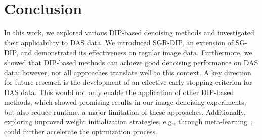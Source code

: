 \chapter{Conclusion}

In this work, we explored various DIP-based denoising methods and investigated their applicability to DAS data.
We introduced SGR-DIP, an extension of SG-DIP, and demonstrated its effectiveness on regular image data.
Furthermore, we showed that DIP-based methods can achieve good denoising performance on DAS data; however, not all approaches translate well to this context.
A key direction for future research is the development of an effective early stopping criterion for DAS data. This would not only enable the application of other DIP-based methods, which showed promising results in our image denoising experiments, but also reduce runtime, a major limitation of these approaches.
Additionally, exploring improved weight initialization strategies, e.g., through meta-learning~\cite{MetaDIP}, could further accelerate the optimization process.

